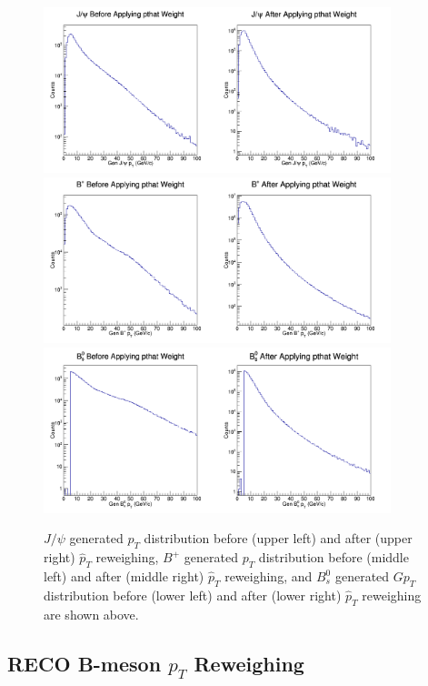 \begin{figure}[h]
\begin{center}
\includegraphics[width= 0.90\textwidth]{Figures/Chapter4/JPsiGenpT.png}
\includegraphics[width= 0.90\textwidth]{Figures/Chapter4/BPlusGenpT.png}
\includegraphics[width= 0.90\textwidth]{Figures/Chapter4/BsGenpT.png}
\caption{ $J/\psi$ generated $p_{T}$ distribution before (upper left) and after (upper right) $\hat p_{T}$ reweighing, $B^+$ generated $p_{T}$ distribution before (middle left) and after (middle right) $\hat p_{T}$ reweighing, and $B_s^0$ generated $Gp_{T}$ distribution before (lower left) and after (lower right) $\hat p_{T}$ reweighing are shown above.}
\label{GENPTDIS}
\end{center}
\end{figure}


\subsection{RECO B-meson ${p}_{T}$ Reweighing}

